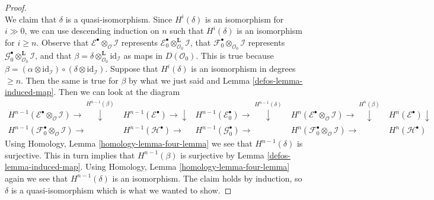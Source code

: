 \begin{proof}
$$$$
We claim that $\delta$ is a quasi-isomorphism. Since $H^i(\delta)$
is an isomorphism for $i \gg 0$, we can use descending induction
on $n$ such that $H^i(\delta)$ is an isomorphism for $i \geq n$.
Observe that
$\mathcal{E}^\bullet \otimes_\mathcal{O} \mathcal{I}$
represents
$\mathcal{E}_0^\bullet \otimes_{\mathcal{O}_0}^\mathbf{L} \mathcal{I}$,
that
$\mathcal{F}_0^\bullet \otimes_{\mathcal{O}_0} \mathcal{I}$
represents
$\mathcal{G}_0^\bullet \otimes_{\mathcal{O}_0}^\mathbf{L} \mathcal{I}$,
and that
$\beta = \delta \otimes_{\mathcal{O}_0}^\mathbf{L} \text{id}_\mathcal{I}$
as maps in $D(\mathcal{O}_0)$. This is true because
$\beta =
(\alpha \otimes \text{id}_\mathcal{I})
\circ
(\delta \otimes \text{id}_\mathcal{I})$.
Suppose that $H^i(\delta)$ is an isomorphism in degrees $\geq n$.
Then the same is true for $\beta$ by what we just said
and Lemma \ref{defos-lemma-induced-map}.
Then we can look at the diagram
$$
\begin{array}{ccccc}H^{n - 1}(\mathcal{E}^\bullet \otimes_\mathcal{O} \mathcal{I})
\longrightarrow\overset{H^{n - 1}(\beta)}{\downarrow} & H^{n - 1}(\mathcal{E}^\bullet) \longrightarrow\downarrow & H^{n - 1}(\mathcal{E}_0^\bullet) \longrightarrow\overset{H^{n - 1}(\delta)}{\downarrow} & H^n(\mathcal{E}^\bullet \otimes_\mathcal{O} \mathcal{I})
\longrightarrow\overset{H^n(\beta)}{\downarrow} & H^n(\mathcal{E}^\bullet) \downarrow \\ H^{n - 1}(\mathcal{F}_0^\bullet \otimes_\mathcal{O} \mathcal{I}) \longrightarrow & H^{n - 1}(\mathcal{H}^\bullet) \longrightarrow & H^{n - 1}(\mathcal{G}_0^\bullet) \longrightarrow & H^n(\mathcal{F}_0^\bullet \otimes_\mathcal{O} \mathcal{I}) \longrightarrow & H^n(\mathcal{H}^\bullet)\end{array}
$$
Using Homology, Lemma \ref{homology-lemma-four-lemma}
we see that $H^{n - 1}(\delta)$ is surjective.
This in turn implies that $H^{n - 1}(\beta)$ is surjective
by Lemma \ref{defos-lemma-induced-map}.
Using Homology, Lemma \ref{homology-lemma-four-lemma}
again we see that $H^{n - 1}(\delta)$ is an isomorphism.
The claim holds by induction, so $\delta$ is a quasi-isomorphism
which is what we wanted to show.
\end{proof}

